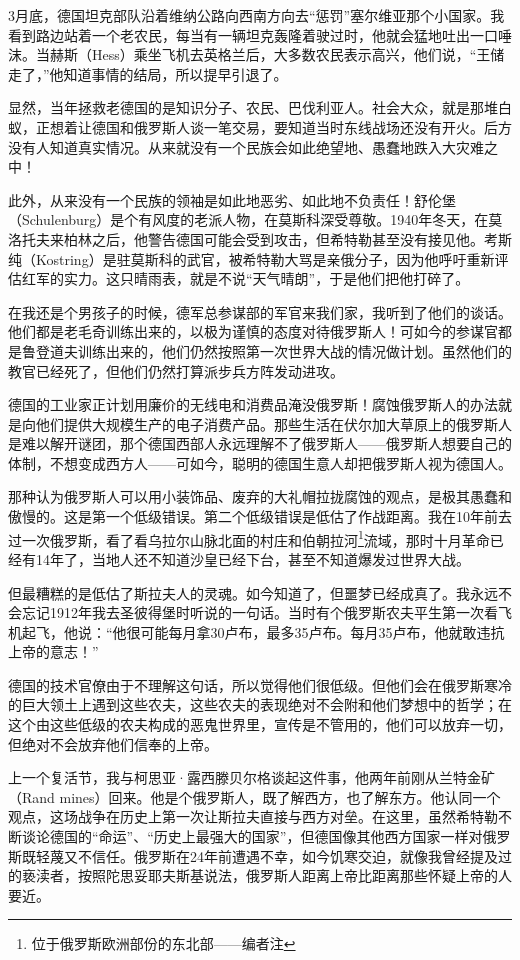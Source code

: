 \documentclass[UTF8]{ctexart}
\begin{document}
3月底，德国坦克部队沿着维纳公路向西南方向去“惩罚”塞尔维亚那个小国家。我看到路边站着一个老农民，每当有一辆坦克轰隆着驶过时，他就会猛地吐出一口唾沫。当赫斯（Hess）乘坐飞机去英格兰后，大多数农民表示高兴，他们说，“王储走了，”他知道事情的结局，所以提早引退了。

显然，当年拯救老德国的是知识分子、农民、巴伐利亚人。社会大众，就是那堆白蚁，正想着让德国和俄罗斯人谈一笔交易，要知道当时东线战场还没有开火。后方没有人知道真实情况。从来就没有一个民族会如此绝望地、愚蠢地跌入大灾难之中！

此外，从来没有一个民族的领袖是如此地恶劣、如此地不负责任！舒伦堡（Schulenburg）是个有风度的老派人物，在莫斯科深受尊敬。1940年冬天，在莫洛托夫来柏林之后，他警告德国可能会受到攻击，但希特勒甚至没有接见他。考斯纯（Kostring）是驻莫斯科的武官，被希特勒大骂是亲俄分子，因为他呼吁重新评估红军的实力。这只晴雨表，就是不说“天气晴朗”，于是他们把他打碎了。

在我还是个男孩子的时候，德军总参谋部的军官来我们家，我听到了他们的谈话。他们都是老毛奇训练出来的，以极为谨慎的态度对待俄罗斯人！可如今的参谋官都是鲁登道夫训练出来的，他们仍然按照第一次世界大战的情况做计划。虽然他们的教官已经死了，但他们仍然打算派步兵方阵发动进攻。

德国的工业家正计划用廉价的无线电和消费品淹没俄罗斯！腐蚀俄罗斯人的办法就是向他们提供大规模生产的电子消费产品。那些生活在伏尔加大草原上的俄罗斯人是难以解开谜团，那个德国西部人永远理解不了俄罗斯人——俄罗斯人想要自己的体制，不想变成西方人——可如今，聪明的德国生意人却把俄罗斯人视为德国人。

那种认为俄罗斯人可以用小装饰品、废弃的大礼帽拉拢腐蚀的观点，是极其愚蠢和傲慢的。这是第一个低级错误。第二个低级错误是低估了作战距离。我在10年前去过一次俄罗斯，看了看乌拉尔山脉北面的村庄和伯朝拉河\footnote{位于俄罗斯欧洲部份的东北部——编者注}流域，那时十月革命已经有14年了，当地人还不知道沙皇已经下台，甚至不知道爆发过世界大战。

但最糟糕的是低估了斯拉夫人的灵魂。如今知道了，但噩梦已经成真了。我永远不会忘记1912年我去圣彼得堡时听说的一句话。当时有个俄罗斯农夫平生第一次看飞机起飞，他说：“他很可能每月拿30卢布，最多35卢布。每月35卢布，他就敢违抗上帝的意志！”

德国的技术官僚由于不理解这句话，所以觉得他们很低级。但他们会在俄罗斯寒冷的巨大领土上遇到这些农夫，这些农夫的表现绝对不会附和他们梦想中的哲学；在这个由这些低级的农夫构成的恶鬼世界里，宣传是不管用的，他们可以放弃一切，但绝对不会放弃他们信奉的上帝。

上一个复活节，我与柯思亚·露西滕贝尔格谈起这件事，他两年前刚从兰特金矿（Rand mines）回来。他是个俄罗斯人，既了解西方，也了解东方。他认同一个观点，这场战争在历史上第一次让斯拉夫直接与西方对垒。在这里，虽然希特勒不断谈论德国的“命运”、“历史上最强大的国家”，但德国像其他西方国家一样对俄罗斯既轻蔑又不信任。俄罗斯在24年前遭遇不幸，如今饥寒交迫，就像我曾经提及过的亵渎者，按照陀思妥耶夫斯基说法，俄罗斯人距离上帝比距离那些怀疑上帝的人要近。
\end{document}
